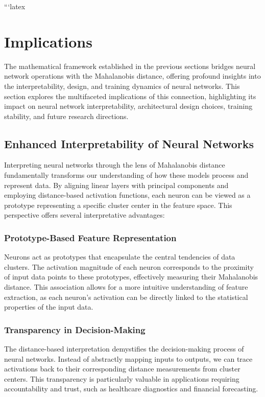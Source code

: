 ```latex

\section{Implications}
\label{sec:implications}

The mathematical framework established in the previous sections bridges neural network operations with the Mahalanobis distance, offering profound insights into the interpretability, design, and training dynamics of neural networks. This section explores the multifaceted implications of this connection, highlighting its impact on neural network interpretability, architectural design choices, training stability, and future research directions.

\subsection{Enhanced Interpretability of Neural Networks}

Interpreting neural networks through the lens of Mahalanobis distance fundamentally transforms our understanding of how these models process and represent data. By aligning linear layers with principal components and employing distance-based activation functions, each neuron can be viewed as a prototype representing a specific cluster center in the feature space. This perspective offers several interpretative advantages:

\subsubsection{Prototype-Based Feature Representation}

Neurons act as prototypes that encapsulate the central tendencies of data clusters. The activation magnitude of each neuron corresponds to the proximity of input data points to these prototypes, effectively measuring their Mahalanobis distance. This association allows for a more intuitive understanding of feature extraction, as each neuron's activation can be directly linked to the statistical properties of the input data.

\subsubsection{Transparency in Decision-Making}

The distance-based interpretation demystifies the decision-making process of neural networks. Instead of abstractly mapping inputs to outputs, we can trace activations back to their corresponding distance measurements from cluster centers. This transparency is particularly valuable in applications requiring accountability and trust, such as healthcare diagnostics and financial forecasting.

